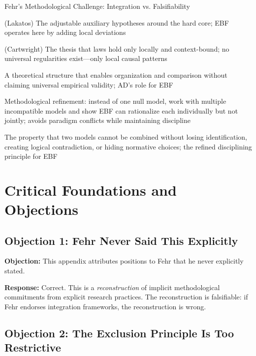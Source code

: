 \begin{chapter}{Fehr's Methodological Challenge: Integration vs. Falsifiability}
\begin{description}[style=nextline]
    \item[Protective Belt] (Lakatos) The adjustable auxiliary hypotheses around the hard core; EBF operates here by adding local deviations
    \item[Dappled World] (Cartwright) The thesis that laws hold only locally and context-bound; no universal regularities exist---only local causal patterns
    \item[Theoretical Scaffold] A theoretical structure that enables organization and comparison without claiming universal empirical validity; AD's role for EBF
    \item[Multiple Models Strategy] Methodological refinement: instead of one null model, work with multiple incompatible models and show EBF can rationalize each individually but not jointly; avoids paradigm conflicts while maintaining discipline
    \item[Non-Integrability] The property that two models cannot be combined without losing identification, creating logical contradiction, or hiding normative choices; the refined disciplining principle for EBF
\end{description}


\section{Critical Foundations and Objections}
\label{sec:foundations}

\subsection{Objection 1: Fehr Never Said This Explicitly}

\textbf{Objection:} This appendix attributes positions to Fehr that he never explicitly stated.

\textbf{Response:} Correct. This is a \textit{reconstruction} of implicit methodological commitments from explicit research practices. The reconstruction is falsifiable: if Fehr endorses integration frameworks, the reconstruction is wrong.

\subsection{Objection 2: The Exclusion Principle Is Too Restrictive}


\end{chapter}
